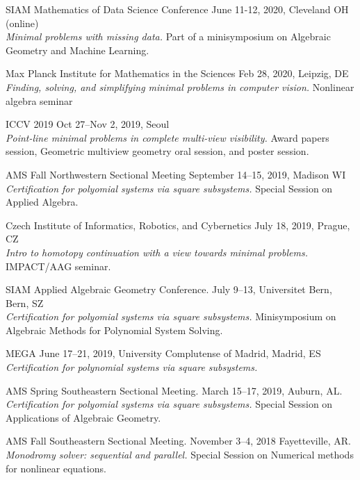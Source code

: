 \documentclass[margin,line,pifont,palatino,courier]{res}
\begin{document}
\begin{resume}
\par SIAM Mathematics of Data Science Conference \hfill June 11-12, 2020, Cleveland OH (online)\\
\textit{Minimal problems with missing data.} Part of a minisymposium on Algebraic Geometry and Machine Learning.

\par Max Planck Institute for Mathematics in the Sciences \hfill Feb 28, 2020, Leipzig, DE\\
\textit{Finding, solving, and simplifying minimal problems in computer vision.} Nonlinear algebra seminar

\par ICCV 2019 \hfill Oct 27--Nov 2, 2019, Seoul\\
\textit{Point-line minimal problems in complete multi-view visibility.} Award papers session, Geometric multiview geometry oral session, and poster session.

\par AMS Fall Northwestern Sectional Meeting \hfill September 14--15, 2019, Madison WI\\
\textit{Certification for polyomial systems via square subsystems.} Special Session on Applied Algebra.

\par Czech Institute of Informatics, Robotics, and Cybernetics \hfill July 18, 2019, Prague, CZ\\
\textit{Intro to homotopy continuation with a view towards minimal problems.} IMPACT/AAG seminar. 

\par SIAM Applied Algebraic Geometry Conference. \hfill July 9--13, Universitet Bern, Bern, SZ \\
\textit{Certification for polyomial systems via square subsystems.} Minisymposium on Algebraic Methods for Polynomial System Solving.

\par MEGA \hfill June 17--21, 2019, University Complutense of Madrid, Madrid, ES\\
\textit{Certification for polynomial systems via square subsystems.}

\par AMS Spring Southeastern Sectional Meeting. \hfill March 15--17, 2019, Auburn, AL.\\
\textit{Certification for polyomial systems via square subsystems.} Special Session on Applications of Algebraic Geometry.

\par AMS Fall Southeastern Sectional Meeting. \hfill November 3--4, 2018 Fayetteville, AR.\\
\textit{Monodromy solver: sequential and parallel.} Special Session on Numerical methods for nonlinear equations.


\end{resume}
\end{document}

